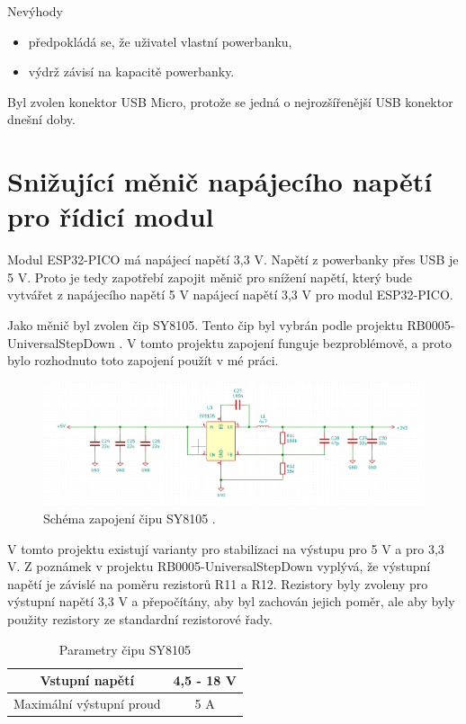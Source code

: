   Nevýhody
  \begin{itemize}
    \item předpokládá se, že uživatel vlastní powerbanku,
    \item výdrž závisí na kapacitě powerbanky. 
  \end{itemize}

  Byl zvolen konektor USB Micro, protože se jedná o nejrozšířenější USB konektor dnešní doby.

  \section{Snižující měnič napájecího napětí pro řídicí modul}
  Modul ESP32-PICO má napájecí napětí 3,3 V. Napětí z powerbanky přes USB je 5 V. Proto je tedy zapotřebí zapojit 
  měnič pro snížení napětí, který bude vytvářet z napájecího napětí 5 V napájecí napětí 3,3 V pro modul ESP32-PICO.

  Jako měnič byl zvolen čip SY8105. Tento čip byl vybrán podle projektu RB0005-UniversalStepDown \cite{UniversalStepDown}. 
  V tomto projektu zapojení funguje bezproblémově, a proto bylo rozhodnuto toto zapojení použít v mé práci. 

  \begin{figure}[!h]
    \begin{center}
      \includegraphics[scale=0.4]{obrazky/SY8105_schema.png}
    \end{center}
    \caption[Schéma zapojení čipu SY8105]{Schéma zapojení čipu SY8105 \cite{SY8105_datasheet} \cite{UniversalStepDown}.}
  \end{figure}

  V tomto projektu existují varianty pro stabilizaci na výstupu pro 5 V a pro 3,3 V. Z poznámek v projektu RB0005-UniversalStepDown 
  vyplývá, že výstupní napětí je závislé na poměru rezistorů R11 a R12. Rezistory byly zvoleny pro výstupní napětí 3,3 V a 
  přepočítány, aby byl zachován jejich poměr, ale aby byly použity rezistory ze standardní rezistorové řady.

  \begin{table}[!h]
    \caption{Parametry čipu SY8105 \cite{SY8105_datasheet}}
    \begin{center}
        \begin{tabular}{|c|c|}
            \hline
            Vstupní napětí             & 4,5 - 18 V \\ 
            \hline
            Maximální výstupní proud   & 5 A \\
            \hline
        \end{tabular}    
    \end{center}
\end{table}

